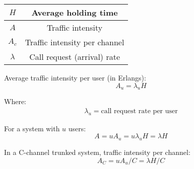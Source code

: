 \begin{tabular}{| c | c |}
    \hline
    $H$ & Average holding time\\
    \hline
    $A$ & Traffic intensity\\
    \hline
    $A_c$ & Traffic intensity per channel\\
    \hline
    $\lambda$ & Call request (arrival) rate\\
    \hline    
\end{tabular}

Average traffic intensity per user (in Erlangs):
\begin{equation}
    A_u = \lambda_u H
\end{equation}

Where:
\begin{gather*}
    \lambda_u = \text{call request rate per user}
\end{gather*}

For a system with $u$ users:
\begin{equation}
    A = u A_u = u \lambda_u H = \lambda H
\end{equation}

In a C-channel trunked system, traffic intensity per channel:
\begin{equation}
    A_C = u A_u / C = \lambda H / C
\end{equation}